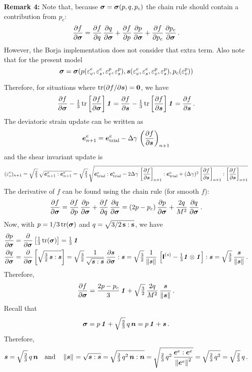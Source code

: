 {\footnotesize
{\bf Remark 4:}  Note that, because $\Bsig = \Bsig(p, q, p_c)$ the 
chain rule should contain a contribution from $p_c$:
\[
  \Partial{f}{\Bsig} = \Partial{f}{q}\,\Partial{q}{\Bsig} + \Partial{f}{p}\,\Partial{p}{\Bsig}
                       + \Partial{f}{p_c}\,\Partial{p_c}{\Bsig} \,.
\]
However, the Borja implementation does not consider that extra term.  Also note that for the present model
\[
  \Bsig = \Bsig(p(\Ve^e_v,\Ve^e_s,\Ve^p_v, \Ve^p_s), \BsT(\Ve^e_v, \Ve^e_s, \Ve^p_v,\Ve^p_s), p_c(\Ve^p_v))
\]
}

Therefore, for situations where $\Tr(\partial f/\partial \BsT) = \Bzero$, we have
\[
  \Partial{f}{\Bsig} - \tfrac{1}{3}\,\Tr\left[\Partial{f}{\Bsig}\right]\Bone = 
     \Partial{f}{\BsT} - \tfrac{1}{3}\,\Tr\left[\Partial{f}{\BsT}\right]\Bone =
     \Partial{f}{\BsT} \,.
\]
The deviatoric strain update can be written as
\[
  \BeT^e_{n+1} = \BeT^e_\Trial - \Delta\gamma\,\left(\Partial{f}{\BsT}\right)_{n+1} 
\]
and the shear invariant update is
\[
  (\Ve_s^e)_{n+1} = \sqrt{\tfrac{2}{3}}\,
  \sqrt{\BeT^e_{n+1}:\BeT^e_{n+1}}
  = \sqrt{\tfrac{2}{3}}\,\sqrt{\BeT^e_\Trial:\BeT^e_\Trial 
     - 2\Delta\gamma\,\left[\Partial{f}{\BsT}\right]_{n+1}:\BeT^e_\Trial
     + (\Delta\gamma)^2\left[\Partial{f}{\BsT}\right]_{n+1}:\left[\Partial{f}{\BsT}\right]_{n+1}}
\]
The derivative of $f$ can be found using the chain rule (for smooth $f$):
\[
   \Partial{f}{\Bsig} = \Partial{f}{p}\,\Partial{p}{\Bsig} + \Partial{f}{q}\,\Partial{q}{\Bsig}
     = (2p - p_c)\,\Partial{p}{\Bsig} + \frac{2q}{M^2}\,\Partial{q}{\Bsig} \,.
\]
Now, with $p = 1/3\,\Tr(\Bsig)$ and $q = \sqrt{3/2\,\Bs:\Bs}$, we have
\[
  \Bal
   \Partial{p}{\Bsig} & = \Partial{}{\Bsig}\left[\tfrac{1}{3}\,\Tr(\Bsig)\right] = \tfrac{1}{3}\,\Bone \\
   \Partial{q}{\Bsig} & = \Partial{}{\Bsig}\left[\sqrt{\tfrac{3}{2}\,\BsT:\BsT}\right]
     = \sqrt{\tfrac{3}{2}}\,\frac{1}{\sqrt{\BsT:\BsT}}\,\Partial{\BsT}{\Bsig}:\BsT
     = \sqrt{\tfrac{3}{2}}\,\frac{1}{\Norm{\BsT}{}}\,\left[\SfI^{(s)}-\tfrac{1}{3}\Bone\otimes\Bone\right]:\BsT
     = \sqrt{\tfrac{3}{2}}\,\frac{\BsT}{\Norm{\BsT}{}}\,.
  \Eal
\]
Therefore,
\[
   \Partial{f}{\Bsig} = \frac{2p - p_c}{3}\,\Bone + \sqrt{\tfrac{3}{2}}\,\frac{2q}{M^2}\,\frac{\BsT}{\Norm{\BsT}{}} \,.
\]
Recall that
\[
   \Bsig = p\,\Bone + \sqrt{\tfrac{2}{3}}\, q\, \BnT = p\,\Bone + \BsT \,.
\]
Therefore,
\[
   \BsT = \sqrt{\tfrac{2}{3}}\,q\,\BnT 
   \quad \Tand \quad
   \Norm{\BsT}{} = \sqrt{\BsT:\BsT} = \sqrt{\tfrac{2}{3}\,q^2\,\BnT:\BnT} = 
     \sqrt{\tfrac{2}{3}\,q^2\,\frac{\BeT^e:\BeT^e}{\Norm{\BeT^e}{}^2}}
     = \sqrt{\tfrac{2}{3}\,q^2} = \sqrt{\tfrac{2}{3}}\,q \,.
\]
